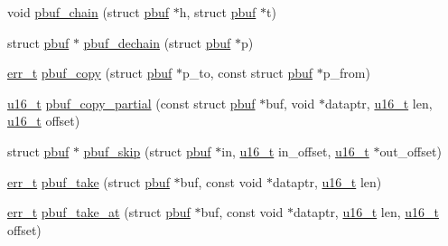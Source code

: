 \begin{DoxyCompactItemize}
\item 
void \hyperlink{group__pbuf_ga831c9a72bda1d3bd4c7b96f5a0e3b891}{pbuf\+\_\+chain} (struct \hyperlink{structpbuf}{pbuf} $\ast$h, struct \hyperlink{structpbuf}{pbuf} $\ast$t)
\item 
struct \hyperlink{structpbuf}{pbuf} $\ast$ \hyperlink{openmote-cc2538_2lwip_2src_2core_2pbuf_8c_abf3d29c4f43986b4cb5eb314d5b9729d}{pbuf\+\_\+dechain} (struct \hyperlink{structpbuf}{pbuf} $\ast$p)
\item 
\hyperlink{group__infrastructure__errors_gaf02d9da80fd66b4f986d2c53d7231ddb}{err\+\_\+t} \hyperlink{group__pbuf_gaba88511dee3df4b631fde691f421320d}{pbuf\+\_\+copy} (struct \hyperlink{structpbuf}{pbuf} $\ast$p\+\_\+to, const struct \hyperlink{structpbuf}{pbuf} $\ast$p\+\_\+from)
\item 
\hyperlink{group__compiler__abstraction_ga77570ac4fcab86864fa1916e55676da2}{u16\+\_\+t} \hyperlink{group__pbuf_gac2f1f58fd36042e82af46f5015720899}{pbuf\+\_\+copy\+\_\+partial} (const struct \hyperlink{structpbuf}{pbuf} $\ast$buf, void $\ast$dataptr, \hyperlink{group__compiler__abstraction_ga77570ac4fcab86864fa1916e55676da2}{u16\+\_\+t} len, \hyperlink{group__compiler__abstraction_ga77570ac4fcab86864fa1916e55676da2}{u16\+\_\+t} offset)
\item 
struct \hyperlink{structpbuf}{pbuf} $\ast$ \hyperlink{group__pbuf_gabe4dfb2409c87a7c52c9a22a779f92e9}{pbuf\+\_\+skip} (struct \hyperlink{structpbuf}{pbuf} $\ast$in, \hyperlink{group__compiler__abstraction_ga77570ac4fcab86864fa1916e55676da2}{u16\+\_\+t} in\+\_\+offset, \hyperlink{group__compiler__abstraction_ga77570ac4fcab86864fa1916e55676da2}{u16\+\_\+t} $\ast$out\+\_\+offset)
\item 
\hyperlink{group__infrastructure__errors_gaf02d9da80fd66b4f986d2c53d7231ddb}{err\+\_\+t} \hyperlink{group__pbuf_gad1e31e370271335b197272af2724ca85}{pbuf\+\_\+take} (struct \hyperlink{structpbuf}{pbuf} $\ast$buf, const void $\ast$dataptr, \hyperlink{group__compiler__abstraction_ga77570ac4fcab86864fa1916e55676da2}{u16\+\_\+t} len)
\item 
\hyperlink{group__infrastructure__errors_gaf02d9da80fd66b4f986d2c53d7231ddb}{err\+\_\+t} \hyperlink{group__pbuf_gae1cf2bf7454ff87ff377b0b2262f9b44}{pbuf\+\_\+take\+\_\+at} (struct \hyperlink{structpbuf}{pbuf} $\ast$buf, const void $\ast$dataptr, \hyperlink{group__compiler__abstraction_ga77570ac4fcab86864fa1916e55676da2}{u16\+\_\+t} len, \hyperlink{group__compiler__abstraction_ga77570ac4fcab86864fa1916e55676da2}{u16\+\_\+t} offset)
\item 

\end{DoxyCompactItemize}

